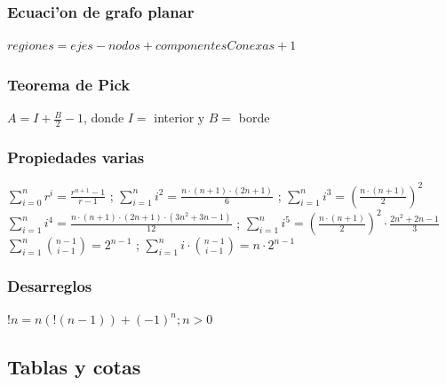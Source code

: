 \subsubsection{Ecuaci'on de grafo planar}
$regiones = ejes - nodos + componentesConexas + 1$
\subsubsection{Teorema de Pick}
$A = I + \frac{B}{2} - 1$, donde $I =$ interior y $B =$ borde
%
\subsubsection{Propiedades varias}
$\sum_{i=0}^n{r^i} = \frac{r^{n+1}-1}{r-1}$ ; $\sum_{i=1}^n{i^2} = \frac{n\cdot(n+1)\cdot(2n+1)}{6}$ ;
$\sum_{i=1}^n{i^3} = \left(\frac{n\cdot(n+1)}{2}\right)^2$ \\
$\sum_{i=1}^n{i^4} = \frac{n\cdot(n+1)\cdot(2n+1)\cdot(3n^2+3n-1)}{12}$ ;
$\sum_{i=1}^{ n} i^5 = \left(\frac{ n \cdot (n+1)}{2}\right) ^2 \cdot \frac{2 n ^2 + 2n - 1}{3}$ \\
%
$\sum_{i=1}^n{\binom{n-1}{i-1}} = 2^{n-1}$ ; $\sum_{i=1}^n{i\cdot\binom{n-1}{i-1}} = n\cdot2^{n-1}$ \\
\subsubsection{Desarreglos}
$!n = n(!(n - 1)) + (-1)^n; n > 0$ 
\subsection{Tablas y cotas}
